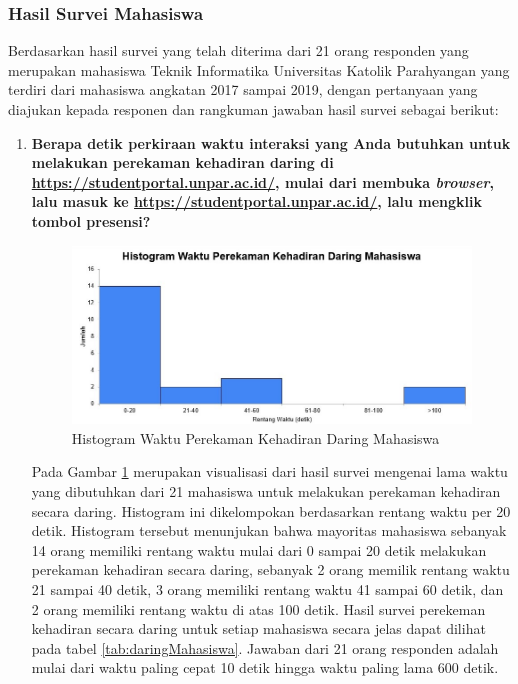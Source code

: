 \subsubsection{Hasil Survei Mahasiswa}
Berdasarkan hasil survei yang telah diterima dari 21 orang responden yang merupakan mahasiswa Teknik Informatika Universitas Katolik
Parahyangan yang terdiri dari mahasiswa angkatan 2017 sampai 2019, dengan pertanyaan yang diajukan kepada responen dan rangkuman jawaban hasil survei sebagai berikut:
\begin{enumerate}
	\item \textbf{Berapa detik perkiraan waktu interaksi yang Anda butuhkan untuk melakukan perekaman kehadiran daring di \url{https://studentportal.unpar.ac.id/}, mulai dari membuka \textit{browser}, lalu masuk ke \url{https://studentportal.unpar.ac.id/}, lalu mengklik tombol presensi?}
	\begin{figure}[H]
		\centering
		\includegraphics[scale=0.6]{Gambar/DaringMahasiswa.jpg}
		\caption{Histogram Waktu Perekaman Kehadiran Daring Mahasiswa} 
		\label{fig:DaringMahasiswa}
	\end{figure}
	Pada Gambar \ref{fig:DaringMahasiswa} merupakan visualisasi dari hasil survei mengenai lama waktu yang dibutuhkan dari 21 mahasiswa untuk melakukan perekaman kehadiran secara daring. Histogram ini dikelompokan berdasarkan rentang waktu per 20 detik. Histogram tersebut menunjukan bahwa mayoritas mahasiswa sebanyak 14 orang memiliki rentang waktu mulai dari 0 sampai 20 detik melakukan perekaman kehadiran secara daring, sebanyak 2 orang memilik rentang waktu 21 sampai 40 detik, 3 orang memiliki rentang waktu 41 sampai 60 detik, dan 2 orang memiliki rentang waktu di atas 100 detik. Hasil survei perekeman kehadiran secara daring untuk setiap mahasiswa secara jelas dapat dilihat pada tabel \ref{tab:daringMahasiswa}. Jawaban dari 21 orang responden adalah mulai dari waktu paling cepat 10 detik hingga waktu paling lama 600 detik.
	\newpage
	\begin{table}[ht]			

\end{table}
\end{enumerate}
